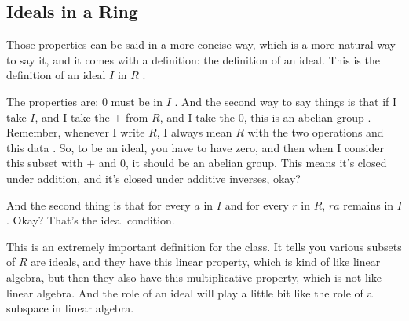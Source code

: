 \subsection{Ideals in a Ring}

\begin{speech}[00:36:11 - 00:38:07]
Those properties can be said in a more concise way, which is a more natural way to say it, and it comes with a definition: the definition of an ideal.  This is the definition of an ideal $I$ in $R$ .

The properties are: $0$ must be in $I$ . And the second way to say things is that if I take $I$, and I take the $+$ from $R$, and I take the $0$, this is an abelian group . Remember, whenever I write $R$, I always mean $R$ with the two operations and this data . So, to be an ideal, you have to have zero, and then when I consider this subset with $+$ and $0$, it should be an abelian group. This means it's closed under addition, and it's closed under additive inverses, okay?

And the second thing is that for every $a$ in $I$ and for every $r$ in $R$, $ra$ remains in $I$ . Okay? That's the ideal condition.

This is an extremely important definition for the class. It tells you various subsets of $R$ are ideals, and they have this linear property, which is kind of like linear algebra, but then they also have this multiplicative property, which is not like linear algebra. And the role of an ideal will play a little bit like the role of a subspace in linear algebra.
\end{speech}

